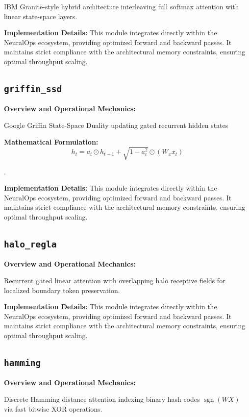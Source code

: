 \documentclass[10pt,twocolumn,letterpaper]{article}
\begin{document}
IBM Granite-style hybrid architecture interleaving full softmax attention with linear state-space layers.

\textbf{Implementation Details:}
This module integrates directly within the NeuralOps ecosystem, providing optimized forward and backward passes. It maintains strict compliance with the architectural memory constraints, ensuring optimal throughput scaling.

\subsection{\texttt{griffin\_ssd}}
\textbf{Overview and Operational Mechanics:}

Google Griffin State-Space Duality updating gated recurrent hidden states

\textbf{Mathematical Formulation:}
\begin{equation}
h_t = a_t \odot h_{t-1} + \sqrt{1-a_t^2} \odot (W_x x_t)
\end{equation}

.

\textbf{Implementation Details:}
This module integrates directly within the NeuralOps ecosystem, providing optimized forward and backward passes. It maintains strict compliance with the architectural memory constraints, ensuring optimal throughput scaling.

\subsection{\texttt{halo\_regla}}
\textbf{Overview and Operational Mechanics:}

Recurrent gated linear attention with overlapping halo receptive fields for localized boundary token preservation.

\textbf{Implementation Details:}
This module integrates directly within the NeuralOps ecosystem, providing optimized forward and backward passes. It maintains strict compliance with the architectural memory constraints, ensuring optimal throughput scaling.

\subsection{\texttt{hamming}}
\textbf{Overview and Operational Mechanics:}

Discrete Hamming distance attention indexing binary hash codes $\operatorname{sgn}(W X)$ via fast bitwise XOR operations.
\end{document}
